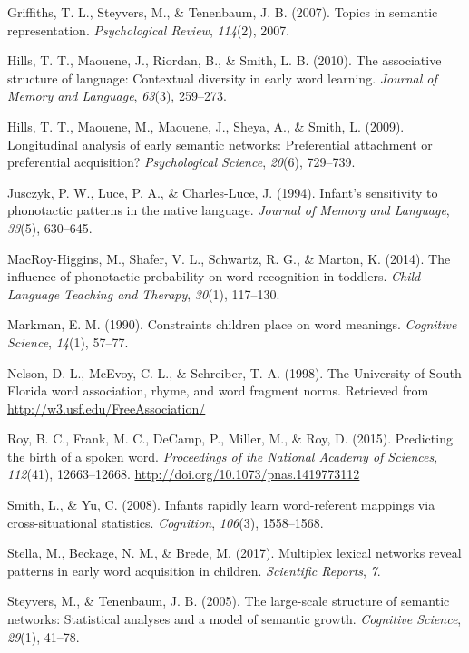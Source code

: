 \documentclass[10pt, letterpaper]{article}
\begin{document}
\hypertarget{ref-griffiths07}{}
Griffiths, T. L., Steyvers, M., \& Tenenbaum, J. B. (2007). Topics in
semantic representation. \emph{Psychological Review}, \emph{114}(2),
2007.

\hypertarget{ref-hills2010}{}
Hills, T. T., Maouene, J., Riordan, B., \& Smith, L. B. (2010). The
associative structure of language: Contextual diversity in early word
learning. \emph{Journal of Memory and Language}, \emph{63}(3), 259--273.

\hypertarget{ref-hills2009}{}
Hills, T. T., Maouene, M., Maouene, J., Sheya, A., \& Smith, L. (2009).
Longitudinal analysis of early semantic networks: Preferential
attachment or preferential acquisition? \emph{Psychological Science},
\emph{20}(6), 729--739.

\hypertarget{ref-jusczyk1994}{}
Jusczyk, P. W., Luce, P. A., \& Charles-Luce, J. (1994). Infant's
sensitivity to phonotactic patterns in the native language.
\emph{Journal of Memory and Language}, \emph{33}(5), 630--645.

\hypertarget{ref-higgins2014}{}
MacRoy-Higgins, M., Shafer, V. L., Schwartz, R. G., \& Marton, K.
(2014). The influence of phonotactic probability on word recognition in
toddlers. \emph{Child Language Teaching and Therapy}, \emph{30}(1),
117--130.

\hypertarget{ref-markman90}{}
Markman, E. M. (1990). Constraints children place on word meanings.
\emph{Cognitive Science}, \emph{14}(1), 57--77.

\hypertarget{ref-nelson1998}{}
Nelson, D. L., McEvoy, C. L., \& Schreiber, T. A. (1998). The University
of South Florida word association, rhyme, and word fragment norms.
Retrieved from \url{http://w3.usf.edu/FreeAssociation/}

\hypertarget{ref-roy2015}{}
Roy, B. C., Frank, M. C., DeCamp, P., Miller, M., \& Roy, D. (2015).
Predicting the birth of a spoken word. \emph{Proceedings of the National
Academy of Sciences}, \emph{112}(41), 12663--12668.
\url{http://doi.org/10.1073/pnas.1419773112}

\hypertarget{ref-smith2008}{}
Smith, L., \& Yu, C. (2008). Infants rapidly learn word-referent
mappings via cross-situational statistics. \emph{Cognition},
\emph{106}(3), 1558--1568.

\hypertarget{ref-stella2017}{}
Stella, M., Beckage, N. M., \& Brede, M. (2017). Multiplex lexical
networks reveal patterns in early word acquisition in children.
\emph{Scientific Reports}, \emph{7}.

\hypertarget{ref-steyvers2005}{}
Steyvers, M., \& Tenenbaum, J. B. (2005). The large-scale structure of
semantic networks: Statistical analyses and a model of semantic growth.
\emph{Cognitive Science}, \emph{29}(1), 41--78.
\end{document}
